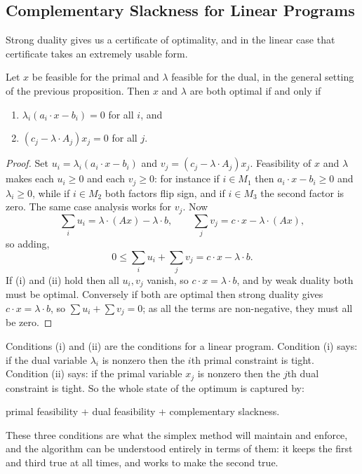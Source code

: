 \documentclass[a4paper]{scrartcl}
\begin{document}
\subsection{Complementary Slackness for Linear Programs}

Strong duality gives us a certificate of optimality, and in the linear case that certificate takes an extremely usable form.

\begin{theorem}
    Let $x$ be feasible for the primal and $\lambda$ feasible for the dual, in the general setting of the previous proposition. Then $x$ and $\lambda$ are both optimal if and only if
    \begin{enumerate}[label=(\roman*)]
        \item $\lambda_i(a_i\cdot x - b_i) = 0$ for all $i$, and
        \item $(c_j - \lambda\cdot A_j)x_j = 0$ for all $j$.
    \end{enumerate}
\end{theorem}
\begin{proof}
    Set $u_i = \lambda_i(a_i\cdot x - b_i)$ and $v_j = (c_j - \lambda\cdot A_j)x_j$. Feasibility of $x$ and $\lambda$ makes each $u_i \geq 0$ and each $v_j \geq 0$: for instance if $i \in M_1$ then $a_i\cdot x - b_i \geq 0$ and $\lambda_i \geq 0$, while if $i \in M_2$ both factors flip sign, and if $i \in M_3$ the second factor is zero. The same case analysis works for $v_j$. Now
    $$
    \sum_i u_i = \lambda\cdot(Ax) - \lambda\cdot b, \qquad \sum_j v_j = c\cdot x - \lambda \cdot (Ax),
    $$
    so adding,
    $$
    0 \leq \sum_i u_i + \sum_j v_j = c\cdot x - \lambda\cdot b.
    $$
    If (i) and (ii) hold then all $u_i, v_j$ vanish, so $c\cdot x = \lambda\cdot b$, and by weak duality both must be optimal. Conversely if both are optimal then strong duality gives $c\cdot x = \lambda\cdot b$, so $\sum u_i + \sum v_j = 0$; as all the terms are non-negative, they must all be zero.
\end{proof}

Conditions (i) and (ii) are the  conditions for a linear program. Condition (i) says: if the dual variable $\lambda_i$ is nonzero then the $i$th primal constraint is tight. Condition (ii) says: if the primal variable $x_j$ is nonzero then the $j$th dual constraint is tight. So the whole state of the optimum is captured by:
\begin{center}
    primal feasibility \quad + \quad dual feasibility \quad + \quad complementary slackness.
\end{center}
These three conditions are what the simplex method will maintain and enforce, and the algorithm can be understood entirely in terms of them: it keeps the first and third true at all times, and works to make the second true.
\end{document}
